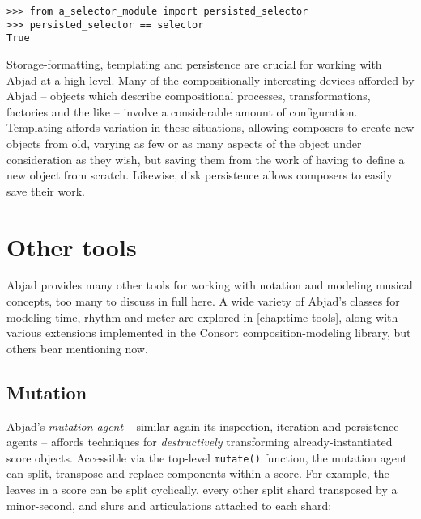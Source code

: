 \begin{abjadbookoutput}
\begin{singlespacing}
\vspace{-0.5\baselineskip}
\begin{verbatim}
>>> from a_selector_module import persisted_selector
>>> persisted_selector == selector
True
\end{verbatim}
\end{singlespacing}
\end{abjadbookoutput}

\noindent Storage-formatting, templating and persistence are crucial for
working with Abjad at a high-level. Many of the compositionally-interesting
devices afforded by Abjad -- objects which describe compositional processes,
transformations, factories and the like -- involve a considerable amount of
configuration. Templating affords variation in these situations, allowing
composers to create new objects from old, varying as few or as many aspects of
the object under consideration as they wish, but saving them from the work of
having to define a new object from scratch. Likewise, disk persistence allows
composers to easily save their work.

\section{Other tools}
\label{sec:other-tools}

Abjad provides many other tools for working with notation and modeling musical
concepts, too many to discuss in full here. A wide variety of Abjad's classes
for modeling time, rhythm and meter are explored in \autoref{chap:time-tools},
along with various extensions implemented in the Consort composition-modeling
library, but others bear mentioning now.

\subsection{Mutation}
\label{ssec:mutation}

Abjad's \emph{mutation agent} -- similar again its inspection, iteration and
persistence agents -- affords techniques for \emph{destructively} transforming
already-instantiated score objects. Accessible via the top-level
\texttt{mutate()} function, the mutation agent can split, transpose and replace
components within a score. For example, the leaves in a score can be split
cyclically, every other split shard transposed by a minor-second, and slurs and
articulations attached to each shard:

